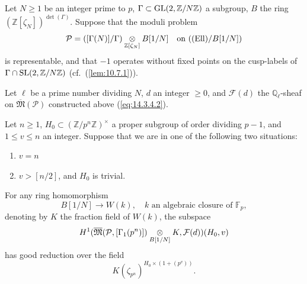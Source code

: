 \begin{theorem}\label{thm:14.5.1}
Let $N \ge 1$ be an integer prime to $p$, $\Gamma \subset \operatorname{GL}(2, \mathbb{Z}/N\mathbb{Z})$ a subgroup, $B$ the ring $(\mathbb{Z}[\zeta_N])^{\det(\Gamma)}$. Suppose that the moduli problem
\[
\mathcal{P} = ([\Gamma(N)]/\Gamma) \underset{\mathbb{Z}[\zeta_N]}{\otimes} B[1/N] \quad \text{on } ((\mathrm{Ell})/B[1/N])
\]
is representable, and that $-1$ operates without fixed points on the cusp-labels of $\Gamma \cap \operatorname{SL}(2, \mathbb{Z}/N\mathbb{Z})$ (cf.~(\ref{lem:10.7.1})).

Let $\ell$ be a prime number dividing $N$, $d$ an integer $\ge 0$, and $\mathcal{F}(d)$ the $\mathbb{Q}_\ell$-sheaf on $\overline{\mathfrak{M}}(\mathcal{P})$ constructed above (\ref{eq:14.3.4.2}).

Let $n \ge 1$, $H_0 \subset (\mathbb{Z}/p^n\mathbb{Z})^\times$ a proper subgroup of order dividing $p-1$, and $1 \le v \le n$ an integer. Suppose that we are in one of the following two situations:
\begin{enumerate}[label=\alph*)]
\item $v = n$
\item $v > [n/2]$, and $H_0$ is trivial.
\end{enumerate}
For any ring homomorphism
\[
B[1/N] \longrightarrow W(k), \quad k \text{ an algebraic closure of } \mathbb{F}_p ,
\]
denoting by $K$ the fraction field of $W(k)$, the subspace
\[
H^1(\overline{\mathfrak{M}}(\mathcal{P}, [\Gamma_1(p^n)]) \underset{B[1/N]}{\otimes} K, \mathcal{F}(d))(H_0, v)
\]
has good reduction over the field
\[
K(\zeta_{p^n})^{H_0 \times (1+(p^v))} .
\]
\end{theorem}

